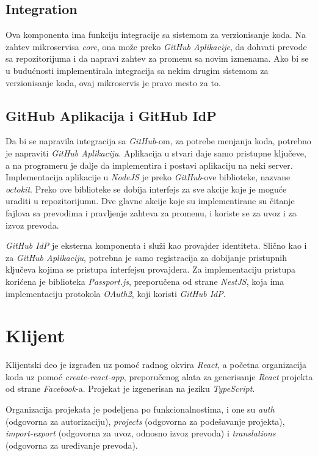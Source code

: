 \subsection{Integration}
Ova komponenta ima funkciju integracije sa sistemom za verzionisanje koda. 
Na zahtev mikroservisa \textit{core}, ona može preko \textit{GitHub Aplikacije}, 
da dohvati prevode sa repozitorijuma i da napravi zahtev za promenu sa 
novim izmenama. Ako bi se u budućnosti implementirala integracija sa nekim 
drugim sistemom za verzionisanje koda, ovaj mikroservis je pravo mesto za to.

\subsection{GitHub Aplikacija i GitHub IdP}
Da bi se napravila integracija sa \textit{GitHub}-om, za potrebe menjanja 
koda, potrebno je napraviti \textit{GitHub Aplikaciju}. Aplikacija 
u stvari daje samo pristupne ključeve, a na programeru je dalje da implementira 
i postavi aplikaciju na neki server. Implementacija aplikacije u \textit{NodeJS} 
je preko \textit{GitHub}-ove biblioteke, nazvane \textit{octokit}. Preko ove 
biblioteke se dobija interfejs za sve akcije koje je moguće uraditi u 
repozitorijumu. Dve glavne akcije koje su implementirane su čitanje fajlova sa 
prevodima i pravljenje zahteva za promenu, i koriste se za uvoz i za 
izvoz prevoda.

\textit{GitHub IdP} je eksterna komponenta i služi kao provajder identiteta. 
Slično kao i za \textit{GitHub Aplikaciju}, potrebna je samo registracija 
za dobijanje pristupnih ključeva kojima se pristupa interfejsu provajdera. 
Za implementaciju pristupa korićena je biblioteka \textit{Passport.js}, 
preporučena od strane \textit{NestJS}, koja ima implementaciju 
protokola \textit{OAuth2}, koji koristi \textit{GitHub IdP}.

\section{Klijent}
Klijentski deo je izgrađen uz pomoć radnog okvira \textit{React}, a početna 
organizacija koda uz pomoć \textit{create-react-app}, preporučenog alata za 
generisanje \textit{React} projekta od strane \textit{Facebook}-a. 
Projekat je izgenerisan na jeziku \textit{TypeScript}. 

Organizacija projekata je podeljena po funkcionalnostima, i one su 
\textit{auth} (odgovorna za autorizaciju), \textit{projects} (odgovorna za 
podešavanje projekta), \textit{import-export} (odgovorna za 
uvoz, odnosno izvoz prevoda) i \textit{translations} (odgovorna za uređivanje 
prevoda).

